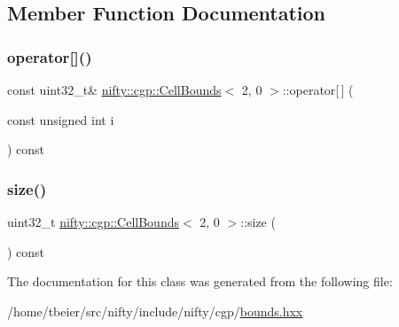 \subsection{Member Function Documentation}
\mbox{\label{classnifty_1_1cgp_1_1CellBounds_3_012_00_010_01_4_abf65a8e2e5f5883485b27d9934d377a3}} 
\subsubsection{\texorpdfstring{operator[]()}{operator[]()}}
{\footnotesize\ttfamily const uint32\+\_\+t\& \hyperlink{classnifty_1_1cgp_1_1CellBounds}{nifty\+::cgp\+::\+Cell\+Bounds}$<$ 2, 0 $>$\+::operator\mbox{[}$\,$\mbox{]} (\begin{DoxyParamCaption}\item[{const unsigned int}]{i }\end{DoxyParamCaption}) const\hspace{0.3cm}{\ttfamily [inline]}}

\mbox{\label{classnifty_1_1cgp_1_1CellBounds_3_012_00_010_01_4_ad23fc19849f68bf4d71914f21bad9ce7}} 
\subsubsection{\texorpdfstring{size()}{size()}}
{\footnotesize\ttfamily uint32\+\_\+t \hyperlink{classnifty_1_1cgp_1_1CellBounds}{nifty\+::cgp\+::\+Cell\+Bounds}$<$ 2, 0 $>$\+::size (\begin{DoxyParamCaption}{ }\end{DoxyParamCaption}) const\hspace{0.3cm}{\ttfamily [inline]}}



The documentation for this class was generated from the following file\+:\begin{DoxyCompactItemize}
\item 
/home/tbeier/src/nifty/include/nifty/cgp/\hyperlink{bounds_8hxx}{bounds.\+hxx}\end{DoxyCompactItemize}
